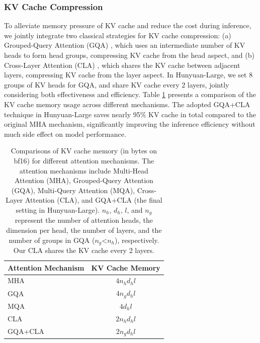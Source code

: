 \documentclass{article}
\begin{document}
\subsubsection{KV Cache Compression}
To alleviate memory pressure of KV cache and reduce the cost during inference, we jointly integrate two classical strategies for KV cache compression: (a) Grouped-Query Attention (GQA) \citep{ainslie2023gqa}, which uses an intermediate number of KV heads to form head groups, compressing KV cache from the head aspect, and (b) Cross-Layer Attention (CLA) \citep{brandon2024reducing}, which shares the KV cache between adjacent layers, compressing KV cache from the layer aspect. In Hunyuan-Large, we set $8$ groups of KV heads for GQA, and share KV cache every $2$ layers, jointly considering both effectiveness and efficiency. Table \ref{tab:kv_cache_comparison} presents a comparison of the KV cache memory usage across different mechanisms. The adopted GQA+CLA technique in Hunyuan-Large saves nearly 95\% KV cache in total compared to the original MHA mechanism, significantly improving the inference efficiency without much side effect on model performance.
\begin{table}[!hbtp]
    \centering
    \caption{Comparisons of KV cache memory (in bytes on bf16) for different attention mechanisms. The attention mechanisms include Multi-Head Attention (MHA), Grouped-Query Attention (GQA), Multi-Query Attention (MQA), Cross-Layer Attention (CLA), and GQA+CLA (the final setting in Hunyuan-Large). \(n_h\), \(d_h\), \(l\), and \(n_g\) represent the number of attention heads, the dimension per head, the number of layers, and the number of groups in GQA (\(n_g\)<\(n_h\)), respectively. Our CLA shares the KV cache every 2 layers.}
        \begin{tabular}{l|c} %
            \toprule
            \textbf{Attention Mechanism} & \textbf{KV Cache Memory} \\
            \midrule
            MHA & $4n_h d_h l$ \\
            GQA & $4n_g d_h l$ \\
            MQA & $4d_h l$ \\
            CLA & $2n_h d_h l$ \\
            GQA+CLA & $2n_g d_h l$ \\
            \bottomrule
        \end{tabular}
    \label{tab:kv_cache_comparison}
\end{table}
\end{document}
